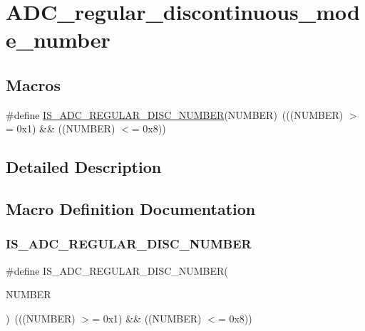 \hypertarget{group___a_d_c__regular__discontinuous__mode__number}{}\section{A\+D\+C\+\_\+regular\+\_\+discontinuous\+\_\+mode\+\_\+number}
\label{group___a_d_c__regular__discontinuous__mode__number}
\subsection*{Macros}
\begin{DoxyCompactItemize}
\item 
\#define \mbox{\hyperlink{group___a_d_c__regular__discontinuous__mode__number_gab8dfaacb2f25e65ca755de71050ff270}{I\+S\+\_\+\+A\+D\+C\+\_\+\+R\+E\+G\+U\+L\+A\+R\+\_\+\+D\+I\+S\+C\+\_\+\+N\+U\+M\+B\+ER}}(N\+U\+M\+B\+ER)~(((N\+U\+M\+B\+ER) $>$= 0x1) \&\& ((\+N\+U\+M\+B\+E\+R) $<$= 0x8))
\end{DoxyCompactItemize}


\subsection{Detailed Description}


\subsection{Macro Definition Documentation}
\mbox{\label{group___a_d_c__regular__discontinuous__mode__number_gab8dfaacb2f25e65ca755de71050ff270}} 
\subsubsection{\texorpdfstring{IS\_ADC\_REGULAR\_DISC\_NUMBER}{IS\_ADC\_REGULAR\_DISC\_NUMBER}}
{\footnotesize\ttfamily \#define I\+S\+\_\+\+A\+D\+C\+\_\+\+R\+E\+G\+U\+L\+A\+R\+\_\+\+D\+I\+S\+C\+\_\+\+N\+U\+M\+B\+ER(\begin{DoxyParamCaption}\item[{}]{N\+U\+M\+B\+ER }\end{DoxyParamCaption})~(((N\+U\+M\+B\+ER) $>$= 0x1) \&\& ((\+N\+U\+M\+B\+E\+R) $<$= 0x8))}

